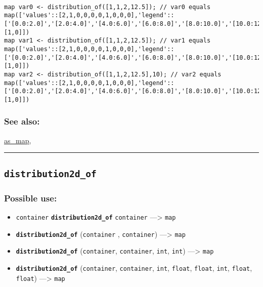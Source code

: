 \documentclass[]{book}
\providecommand{\tightlist}{%
  \setlength{\itemsep}{0pt}\setlength{\parskip}{0pt}}
\theoremstyle{definition}
\theoremstyle{definition}
\theoremstyle{definition}
\theoremstyle{remark}
\begin{document}
\begin{verbatim}
 
map var0 <- distribution_of([1,1,2,12.5]); // var0 equals map(['values'::[2,1,0,0,0,0,1,0,0,0],'legend'::['[0.0:2.0]','[2.0:4.0]','[4.0:6.0]','[6.0:8.0]','[8.0:10.0]','[10.0:12.0]','[12.0:14.0]','[14.0:16.0]','[16.0:18.0]','[18.0:20.0]'],'parlist'::[1,0]]) 
map var1 <- distribution_of([1,1,2,12.5]); // var1 equals map(['values'::[2,1,0,0,0,0,1,0,0,0],'legend'::['[0.0:2.0]','[2.0:4.0]','[4.0:6.0]','[6.0:8.0]','[8.0:10.0]','[10.0:12.0]','[12.0:14.0]','[14.0:16.0]','[16.0:18.0]','[18.0:20.0]'],'parlist'::[1,0]]) 
map var2 <- distribution_of([1,1,2,12.5],10); // var2 equals map(['values'::[2,1,0,0,0,0,1,0,0,0],'legend'::['[0.0:2.0]','[2.0:4.0]','[4.0:6.0]','[6.0:8.0]','[8.0:10.0]','[10.0:12.0]','[12.0:14.0]','[14.0:16.0]','[16.0:18.0]','[18.0:20.0]'],'parlist'::[1,0]])
\end{verbatim}

\subsubsection{See also:}\label{see-also-82}

\href{OperatorsAA\#as_map}{as\_map},

\begin{center}\rule{0.5\linewidth}{\linethickness}\end{center}

\subsection{\texorpdfstring{\texttt{distribution2d\_of}}{distribution2d\_of}}\label{distribution2d_of}

\subsubsection{Possible use:}\label{possible-use-139}

\begin{itemize}
\tightlist
\item
  \texttt{container} \textbf{\texttt{distribution2d\_of}}
  \texttt{container} ---\textgreater{} \texttt{map}
\item
  \textbf{\texttt{distribution2d\_of}} (\texttt{container} ,
  \texttt{container}) ---\textgreater{} \texttt{map}
\item
  \textbf{\texttt{distribution2d\_of}} (\texttt{container},
  \texttt{container}, \texttt{int}, \texttt{int}) ---\textgreater{}
  \texttt{map}
\item
  \textbf{\texttt{distribution2d\_of}} (\texttt{container},
  \texttt{container}, \texttt{int}, \texttt{float}, \texttt{float},
  \texttt{int}, \texttt{float}, \texttt{float}) ---\textgreater{}
  \texttt{map}
\end{itemize}
\end{document}
